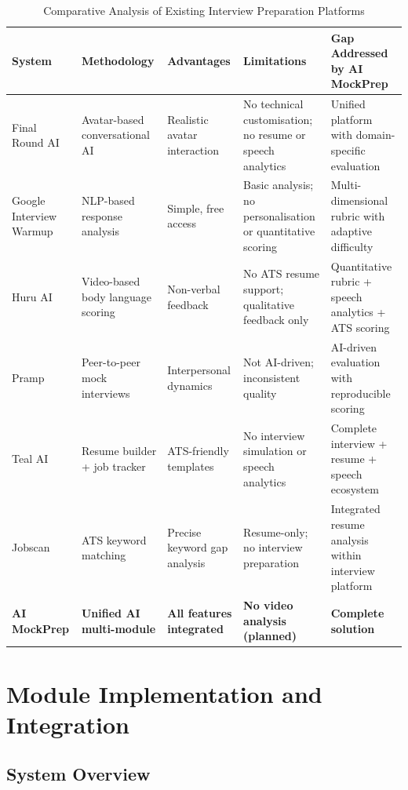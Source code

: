 \documentclass[12pt,a4paper,oneside]{report}
\begin{document}
\begin{table}[H]
\centering
\caption{Comparative Analysis of Existing Interview Preparation Platforms}
\label{tab:literature_comparison}
\begin{tabular}{|p{2.3cm}|p{2.5cm}|p{3cm}|p{2.5cm}|p{2.5cm}|}
\hline
\textbf{System} & \textbf{Methodology} & \textbf{Advantages} & \textbf{Limitations} & \textbf{Gap Addressed by AI MockPrep} \\
\hline
Final Round AI & Avatar-based conversational AI & Realistic avatar interaction & No technical customisation; no resume or speech analytics & Unified platform with domain-specific evaluation \\
\hline
Google Interview Warmup & NLP-based response analysis & Simple, free access & Basic analysis; no personalisation or quantitative scoring & Multi-dimensional rubric with adaptive difficulty \\
\hline
Huru AI & Video-based body language scoring & Non-verbal feedback & No ATS resume support; qualitative feedback only & Quantitative rubric + speech analytics + ATS scoring \\
\hline
Pramp & Peer-to-peer mock interviews & Interpersonal dynamics & Not AI-driven; inconsistent quality & AI-driven evaluation with reproducible scoring \\
\hline
Teal AI & Resume builder + job tracker & ATS-friendly templates & No interview simulation or speech analytics & Complete interview + resume + speech ecosystem \\
\hline
Jobscan & ATS keyword matching & Precise keyword gap analysis & Resume-only; no interview preparation & Integrated resume analysis within interview platform \\
\hline
\textbf{AI MockPrep} & \textbf{Unified AI multi-module} & \textbf{All features integrated} & \textbf{No video analysis (planned)} & \textbf{Complete solution} \\
\hline
\end{tabular}
\end{table}


\chapter{Module Implementation and Integration}
\label{ch:module_impl}

\section{System Overview}
\end{document}
